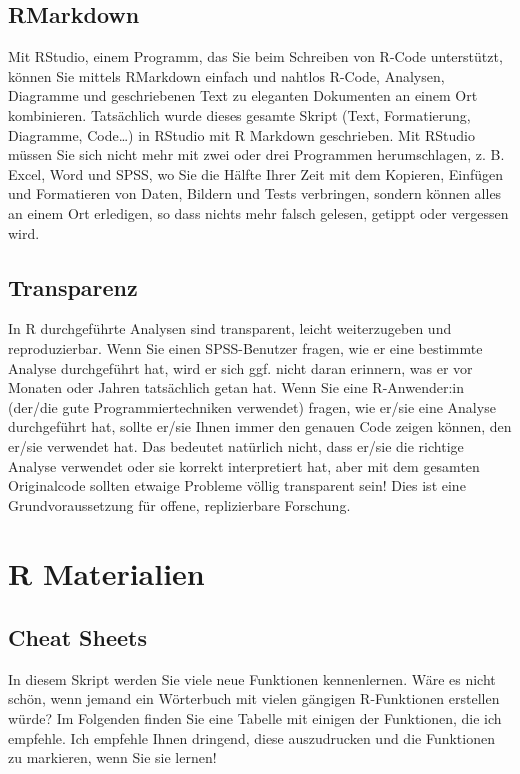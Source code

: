 \documentclass[
]{book}
\begin{document}
\section{RMarkdown}\label{rmarkdown}

Mit RStudio, einem Programm, das Sie beim Schreiben von R-Code unterstützt, können Sie mittels RMarkdown einfach und nahtlos R-Code, Analysen, Diagramme und geschriebenen Text zu eleganten Dokumenten an einem Ort kombinieren. Tatsächlich wurde dieses gesamte Skript (Text, Formatierung, Diagramme, Code\ldots) in RStudio mit R Markdown geschrieben. Mit RStudio müssen Sie sich nicht mehr mit zwei oder drei Programmen herumschlagen, z. B. Excel, Word und SPSS, wo Sie die Hälfte Ihrer Zeit mit dem Kopieren, Einfügen und Formatieren von Daten, Bildern und Tests verbringen, sondern können alles an einem Ort erledigen, so dass nichts mehr falsch gelesen, getippt oder vergessen wird.

\section{Transparenz}\label{transparenz}

In R durchgeführte Analysen sind transparent, leicht weiterzugeben und reproduzierbar. Wenn Sie einen SPSS-Benutzer fragen, wie er eine bestimmte Analyse durchgeführt hat, wird er sich ggf. nicht daran erinnern, was er vor Monaten oder Jahren tatsächlich getan hat. Wenn Sie eine R-Anwender:in (der/die gute Programmiertechniken verwendet) fragen, wie er/sie eine Analyse durchgeführt hat, sollte er/sie Ihnen immer den genauen Code zeigen können, den er/sie verwendet hat. Das bedeutet natürlich nicht, dass er/sie die richtige Analyse verwendet oder sie korrekt interpretiert hat, aber mit dem gesamten Originalcode sollten etwaige Probleme völlig transparent sein! Dies ist eine Grundvoraussetzung für offene, replizierbare Forschung.

\chapter{R Materialien}\label{r-materialien}

\section{Cheat Sheets}\label{cheat-sheets}

In diesem Skript werden Sie viele neue Funktionen kennenlernen. Wäre es nicht schön, wenn jemand ein Wörterbuch mit vielen gängigen R-Funktionen erstellen würde? Im Folgenden finden Sie eine Tabelle mit einigen der Funktionen, die ich empfehle. Ich empfehle Ihnen dringend, diese auszudrucken und die Funktionen zu markieren, wenn Sie sie lernen!
\end{document}
